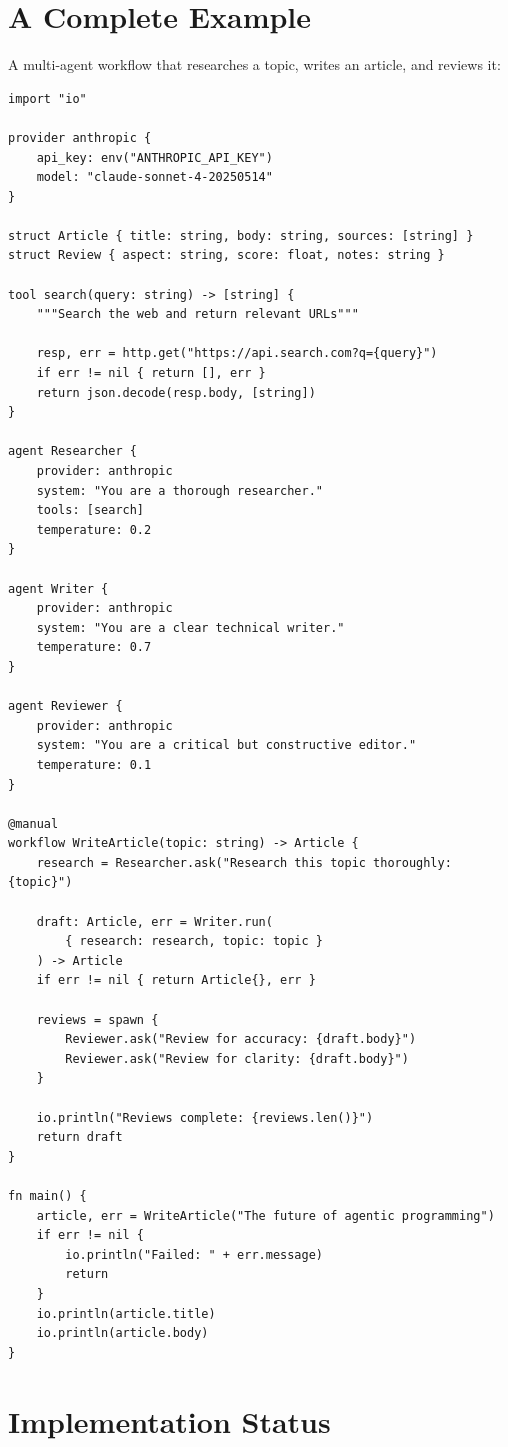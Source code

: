 \section{A Complete Example}

A multi-agent workflow that researches a topic, writes an article, and reviews it:

\begin{lstlisting}
import "io"

provider anthropic {
    api_key: env("ANTHROPIC_API_KEY")
    model: "claude-sonnet-4-20250514"
}

struct Article { title: string, body: string, sources: [string] }
struct Review { aspect: string, score: float, notes: string }

tool search(query: string) -> [string] {
    """Search the web and return relevant URLs"""

    resp, err = http.get("https://api.search.com?q={query}")
    if err != nil { return [], err }
    return json.decode(resp.body, [string])
}

agent Researcher {
    provider: anthropic
    system: "You are a thorough researcher."
    tools: [search]
    temperature: 0.2
}

agent Writer {
    provider: anthropic
    system: "You are a clear technical writer."
    temperature: 0.7
}

agent Reviewer {
    provider: anthropic
    system: "You are a critical but constructive editor."
    temperature: 0.1
}

@manual
workflow WriteArticle(topic: string) -> Article {
    research = Researcher.ask("Research this topic thoroughly: {topic}")

    draft: Article, err = Writer.run(
        { research: research, topic: topic }
    ) -> Article
    if err != nil { return Article{}, err }

    reviews = spawn {
        Reviewer.ask("Review for accuracy: {draft.body}")
        Reviewer.ask("Review for clarity: {draft.body}")
    }

    io.println("Reviews complete: {reviews.len()}")
    return draft
}

fn main() {
    article, err = WriteArticle("The future of agentic programming")
    if err != nil {
        io.println("Failed: " + err.message)
        return
    }
    io.println(article.title)
    io.println(article.body)
}
\end{lstlisting}

\section{Implementation Status}

